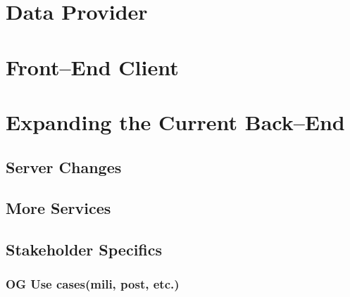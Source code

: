 \section{Data Provider}
\section{Front--End Client}
\section{Expanding the Current Back--End}
\subsection{Server Changes}
\subsection{More Services}
\subsection{Stakeholder Specifics}
\subsubsection{OG Use cases(mili, post, etc.)}
%
%
